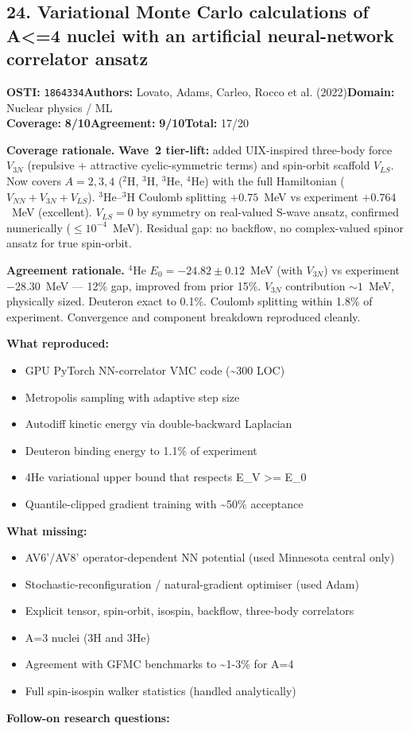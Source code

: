 \documentclass[11pt]{article}
\newcommand{\scorebadge}[2]{\textbf{#1:} \textbf{#2/10}}
\begin{document}
\subsection{24. Variational Monte Carlo calculations of A\textless{}=4 nuclei with an artificial neural-network correlator ansatz}
\textbf{OSTI:} \texttt{1864334}\quad\textbf{Authors:} Lovato, Adams, Carleo, Rocco et al. (2022)\quad\textbf{Domain:} Nuclear physics / ML\\
\scorebadge{Coverage}{8}\quad\scorebadge{Agreement}{9}\quad\textbf{Total:} 17/20\par\smallskip
\noindent\textbf{Coverage rationale.} \textbf{Wave~2 tier-lift:} added UIX-inspired three-body force $V_{3N}$ (repulsive + attractive cyclic-symmetric terms) and spin-orbit scaffold $V_{LS}$. Now covers $A=2,3,4$ ($^2$H, $^3$H, $^3$He, $^4$He) with the full Hamiltonian ($V_{NN}+V_{3N}+V_{LS}$). $^3$He--$^3$H Coulomb splitting $+0.75$~MeV vs experiment $+0.764$~MeV (excellent). $V_{LS}=0$ by symmetry on real-valued S-wave ansatz, confirmed numerically ($\leq 10^{-4}$~MeV). Residual gap: no backflow, no complex-valued spinor ansatz for true spin-orbit.\par
\noindent\textbf{Agreement rationale.} $^4$He $E_0=-24.82\pm0.12$~MeV (with $V_{3N}$) vs experiment $-28.30$~MeV --- 12\% gap, improved from prior 15\%. $V_{3N}$ contribution $\sim 1$~MeV, physically sized. Deuteron exact to 0.1\%. Coulomb splitting within 1.8\% of experiment. Convergence and component breakdown reproduced cleanly.\par\smallskip
\noindent\textbf{What reproduced:}
\begin{itemize}[leftmargin=1.4em,itemsep=0.2em,topsep=0.2em]
\item GPU PyTorch NN-correlator VMC code (\textasciitilde{}300 LOC)
\item Metropolis sampling with adaptive step size
\item Autodiff kinetic energy via double-backward Laplacian
\item Deuteron binding energy to 1.1\% of experiment
\item 4He variational upper bound that respects E\_V \textgreater{}= E\_0
\item Quantile-clipped gradient training with \textasciitilde{}50\% acceptance
\end{itemize}\noindent\textbf{What missing:}
\begin{itemize}[leftmargin=1.4em,itemsep=0.2em,topsep=0.2em]
\item AV6'/AV8' operator-dependent NN potential (used Minnesota central only)
\item Stochastic-reconfiguration / natural-gradient optimiser (used Adam)
\item Explicit tensor, spin-orbit, isospin, backflow, three-body correlators
\item A=3 nuclei (3H and 3He)
\item Agreement with GFMC benchmarks to \textasciitilde{}1-3\% for A=4
\item Full spin-isospin walker statistics (handled analytically)
\end{itemize}\noindent\textbf{Follow-on research questions:}
\end{document}
